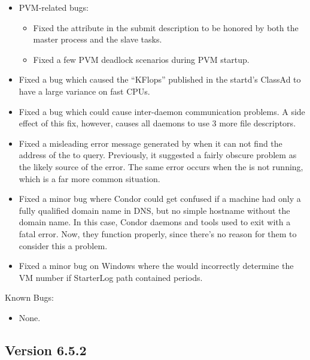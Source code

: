 \begin{itemize}
\item PVM-related bugs:
  \begin{itemize}
    \item Fixed the  attribute in the submit description 
		to be honored by both the master process and the slave tasks.
    \item Fixed a few PVM deadlock scenarios during PVM startup.
  \end{itemize}

\item Fixed a bug which caused the ``KFlops'' published in the
startd's ClassAd to have a large variance on fast CPUs.

\item Fixed a bug which could cause inter-daemon communication
problems.  A side effect of this fix, however, causes all daemons to
use 3 more file descriptors.

\item Fixed a misleading error message generated by  when it
  can not find the address of the  to query.
  Previously, it suggested a fairly obscure problem as the likely
  source of the error.
  The same error occurs when the  is not running, which
  is a far more common situation.

\item Fixed a minor bug where Condor could get confused if a machine
  had only a fully qualified domain name in DNS, but no simple
  hostname without the domain name.
  In this case, Condor daemons and tools used to exit with a fatal
  error.
  Now, they function properly, since there's no reason for them to
  consider this a problem.

 \item Fixed a minor bug on Windows where the  would
   incorrectly determine the VM number if StarterLog path contained
   periods.

\end{itemize}

\noindent Known Bugs:

\begin{itemize}

\item None.

\end{itemize}


\subsection{\label{sec:New-6-5-3}Version 6.5.2}

